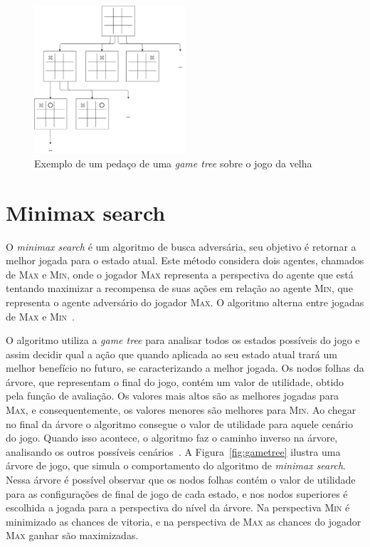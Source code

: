\begin{figure}[ht]
	\centering
	\includegraphics[width=0.5\textwidth]{fig/jogodavelha.pdf}
	\caption{Exemplo de um pedaço de uma \textit{game tree} sobre o jogo da velha}
	\label{fig:jogodavelha}
\end{figure} 

\section{Minimax search}
\label{sec:minimax}

O \textit{minimax search} é um algoritmo de busca adversária, seu objetivo é retornar a melhor jogada para o estado atual. 
Este método considera dois agentes, chamados de \textsc{Max} e \textsc{Min}, onde o jogador \textsc{Max} representa a perspectiva do agente que está tentando maximizar a recompensa de suas ações em relação ao agente \textsc{Min}, que representa o agente adversário do jogador \textsc{Max}. 
O algoritmo alterna entre jogadas de \textsc{Max} e \textsc{Min}~\cite[Capítulo 5]{intelligence2003modern}. 

O algoritmo utiliza a \textit{game tree} para analisar todos os estados possíveis do jogo e assim decidir qual a ação que quando aplicada ao seu estado atual trará um melhor benefício no futuro, se caracterizando a melhor jogada. 
Os nodos folhas da árvore, que representam o final do jogo, contém um valor de utilidade, obtido pela função de avaliação. 
Os valores mais altos são as melhores jogadas para \textsc{Max}, e consequentemente, os valores menores são melhores para \textsc{Min}. 
Ao chegar no final da árvore o algoritmo consegue o valor de utilidade para aquele cenário do jogo.
Quando isso acontece, o algoritmo faz o caminho inverso na árvore, analisando os outros possíveis cenários~\cite[Capítulo 5]{intelligence2003modern}. 
A Figura~\ref{fig:gametree} ilustra uma árvore de jogo, que simula o comportamento do algoritmo de \textit{minimax search}. 
Nessa árvore é possível observar que os nodos folhas contém o valor de utilidade para as configurações de final de jogo de cada estado, e nos nodos superiores é escolhida a jogada para a perspectiva do nível da árvore.
Na perspectiva \textsc{Min} é minimizado as chances de vitoria, e na perspectiva de \textsc{Max} as chances do jogador \textsc{Max} ganhar são maximizadas.

